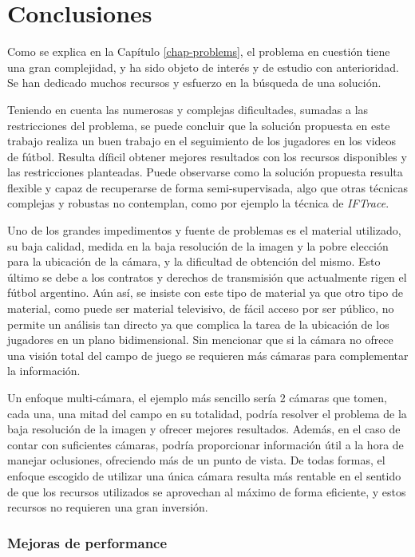 \chapter{Conclusiones}
\label{chap-conclusion}

Como se explica en la Capítulo \ref{chap-problems}, el problema en cuestión
tiene una gran complejidad, y ha sido objeto de interés y de estudio con
anterioridad. Se han dedicado muchos recursos y esfuerzo en la búsqueda de una
solución.

Teniendo en cuenta las numerosas y complejas dificultades, sumadas a las
restricciones del problema, se puede concluir que la solución propuesta en este
trabajo realiza un buen trabajo en el seguimiento de los jugadores en los
videos de fútbol. Resulta díficil obtener mejores resultados con los recursos
disponibles y las restricciones planteadas. Puede observarse como la solución
propuesta resulta flexible y capaz de recuperarse de forma semi-supervisada,
algo que otras técnicas complejas y robustas no contemplan, como por ejemplo la
técnica de \textit{IFTrace}.

Uno de los grandes impedimentos y fuente de problemas es el material utilizado,
su baja calidad, medida en la baja resolución de la imagen y la pobre elección
para la ubicación de la cámara, y la dificultad de obtención del mismo. Esto
último se debe a los contratos y derechos de transmisión que actualmente rigen
el fútbol argentino. Aún así, se insiste con este tipo de material ya que otro
tipo de material, como puede ser material televisivo, de fácil acceso por ser
público, no permite un análisis tan directo ya que complica la tarea de la
ubicación de los jugadores en un plano bidimensional. Sin mencionar que si la
cámara no ofrece una visión total del campo de juego se requieren más cámaras
para complementar la información.

Un enfoque multi-cámara, el ejemplo más sencillo sería 2 cámaras que tomen,
cada una, una mitad del campo en su totalidad, podría resolver el problema de
la baja resolución de la imagen y ofrecer mejores resultados. Además, en el
caso de contar con suficientes cámaras, podría proporcionar información útil a
la hora de manejar oclusiones, ofreciendo más de un punto de vista. De todas
formas, el enfoque escogido de utilizar una única cámara resulta más rentable
en el sentido de que los recursos utilizados se aprovechan al máximo de forma
eficiente, y estos recursos no requieren una gran inversión.

\subsection{Mejoras de performance}


